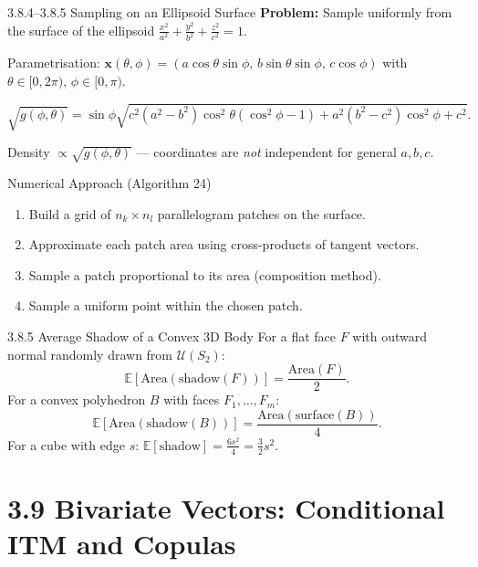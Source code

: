 \documentclass[aspectratio=169,10pt]{beamer}
\newcommand{\EE}{\mathbb{E}}
\newcommand{\UU}{\mathcal{U}}
\begin{document}
\begin{frame}[allowframebreaks]{3.8.4--3.8.5 Sampling on an Ellipsoid Surface}
  \textbf{Problem:} Sample uniformly from the surface of the ellipsoid
  $\frac{x^2}{a^2}+\frac{y^2}{b^2}+\frac{z^2}{c^2}=1$.

  \medskip
  Parametrisation: $\mathbf{x}(\theta,\phi) = (a\cos\theta\sin\phi,\,
  b\sin\theta\sin\phi,\,c\cos\phi)$ with
  $\theta\in[0,2\pi)$, $\phi\in[0,\pi)$.

  \[
    \sqrt{g(\phi,\theta)} = \sin\phi\!\sqrt{c^2(a^2-b^2)\cos^2\theta(\cos^2\phi-1) + a^2(b^2-c^2)\cos^2\phi + c^2}.
  \]

  Density $\propto\sqrt{g(\phi,\theta)}$ --- coordinates are \emph{not} independent
  for general $a,b,c$.

  \medskip
  \begin{block}{Numerical Approach (Algorithm 24)}
    \begin{enumerate}
      \item Build a grid of $n_k\times n_l$ parallelogram patches on the surface.
      \item Approximate each patch area using cross-products of tangent vectors.
      \item Sample a patch proportional to its area (composition method).
      \item Sample a uniform point within the chosen patch.
    \end{enumerate}
  \end{block}

  \framebreak

  \begin{block}{3.8.5 Average Shadow of a Convex 3D Body}
    For a flat face $F$ with outward normal randomly drawn from $\UU(S_2)$:
    \[
      \EE[\mathrm{Area}(\mathrm{shadow}(F))] = \frac{\mathrm{Area}(F)}{2}.
    \]
    For a convex polyhedron $B$ with faces $F_1,\ldots,F_m$:
    \[
      \EE[\mathrm{Area}(\mathrm{shadow}(B))]
      = \frac{\mathrm{Area}(\mathrm{surface}(B))}{4}.
    \]
    For a cube with edge $s$: $\EE[\mathrm{shadow}] = \frac{6s^2}{4} = \frac{3}{2}s^2$.
  \end{block}
\end{frame}

\section{3.9 Bivariate Vectors: Conditional ITM and Copulas}
\end{document}
